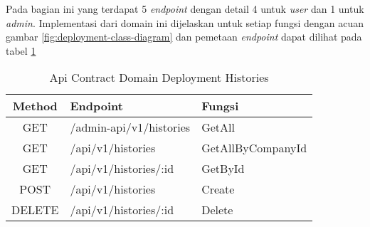 Pada bagian ini yang terdapat 5 \textit{endpoint} dengan detail 4 untuk \textit{user} dan 1 untuk \textit{admin}. Implementasi dari domain ini dijelaskan untuk setiap fungsi dengan acuan gambar \ref{fig:deployment-class-diagram} dan pemetaan \textit{endpoint} dapat dilihat pada tabel \ref{tab:api-contract-domain-deployment-histories}

\bgroup
\begin{table}[htbp]
    \caption{Api Contract Domain Deployment Histories}
    \label{tab:api-contract-domain-deployment-histories}
    \def\arraystretch{1.7}
    \centering
    \begin{tabular}{|c|p{6cm}|p{4cm}|}
        \hline
        Method & Endpoint                &
        Fungsi                                               \\
        \hline
        GET    & /admin-api/v1/histories & GetAll            \\
        \hline
        GET    & /api/v1/histories       & GetAllByCompanyId \\
        \hline
        GET    & /api/v1/histories/:id   & GetById           \\
        \hline
        POST   & /api/v1/histories       & Create            \\
        \hline
        DELETE & /api/v1/histories/:id   & Delete            \\
        \hline
    \end{tabular}
\end{table}
\egroup


